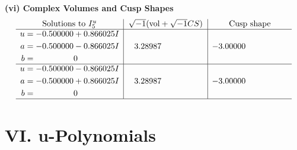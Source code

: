 \documentclass[1p]{elsarticle_modified}
\theoremstyle{definition}
\newcommand{\I}{\sqrt{-1}}
\begin{document}
\newpage\flushleft \textbf{(vi) Complex Volumes and Cusp Shapes}
$$\begin{array}{c|c|c}  
\text{Solutions to }I^u_{5}& \I (\text{vol} + \sqrt{-1}CS) & \text{Cusp shape}\\
 \hline 
\begin{aligned}
u &= -0.500000 + 0.866025 I \\
a &= -0.500000 - 0.866025 I \\
b &= \phantom{-0.000000 } 0\end{aligned}
 & \phantom{-}3.28987\phantom{ +0.000000I} & -3.00000\phantom{ +0.000000I} \\ \hline\begin{aligned}
u &= -0.500000 - 0.866025 I \\
a &= -0.500000 + 0.866025 I \\
b &= \phantom{-0.000000 } 0\end{aligned}
 & \phantom{-}3.28987\phantom{ +0.000000I} & -3.00000\phantom{ +0.000000I}\\
 \hline 
 \end{array}$$\newpage
\newpage\renewcommand{\arraystretch}{1}
\centering \section*{ VI. u-Polynomials}
\end{document}
